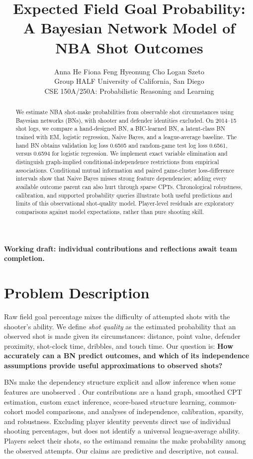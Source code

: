\documentclass{article}
\title{Expected Field Goal Probability:\\A Bayesian Network Model of NBA Shot Outcomes}
\author{Anna He \quad Fiona Feng \quad Hyeonung Cho \quad Logan Szeto\\
Group HALF \quad University of California, San Diego\\
CSE 150A/250A: Probabilistic Reasoning and Learning}
\begin{document}
\maketitle
\begin{center}\small\textbf{Working draft: individual contributions and reflections await team completion.}\end{center}

\begin{abstract}
We estimate NBA shot-make probabilities from observable shot circumstances using
Bayesian networks (BNs), with shooter and defender identities excluded. On
2014--15 shot logs, we compare a hand-designed BN, a BIC-learned BN, a latent-class
BN trained with EM, logistic regression, Naive Bayes, and a league-average baseline. The hand BN obtains
validation log loss 0.6505 and random-game test log loss 0.6561, versus 0.6594 for
logistic regression. We implement exact variable elimination and distinguish
graph-implied conditional-independence restrictions from empirical associations.
Conditional mutual information and paired game-cluster loss-difference intervals show
that Naive Bayes misses strong feature dependencies; adding every available
outcome parent can also hurt through sparse CPTs. Chronological robustness,
calibration, and supported probability queries illustrate both useful predictions
and limits of this observational shot-quality model. Player-level residuals are
exploratory comparisons against model expectations, rather than pure shooting skill.
\end{abstract}

\section{Problem Description}
Raw field goal percentage mixes the difficulty of attempted shots with the
shooter's ability. We define \emph{shot quality} as the estimated probability that
an observed shot is made given its circumstances: distance, point value, defender
proximity, shot-clock time, dribbles, and touch time. Our question is:
\textbf{How accurately can a BN predict outcomes, and which of its independence
assumptions provide useful approximations to observed shots?}

BNs make the dependency structure explicit and allow inference when some features
are unobserved \citep{koller}. Our contributions are a hand graph, smoothed CPT
estimation, custom exact inference, score-based structure learning, common-cohort
model comparisons, and analyses of independence, calibration, sparsity, and
robustness. Excluding player identity prevents direct use of individual shooting
percentages, but does not identify a universal league-average ability. Players
select their shots, so the estimand remains the make probability among the
observed attempts. Our claims are predictive and descriptive, not causal.
\end{document}
